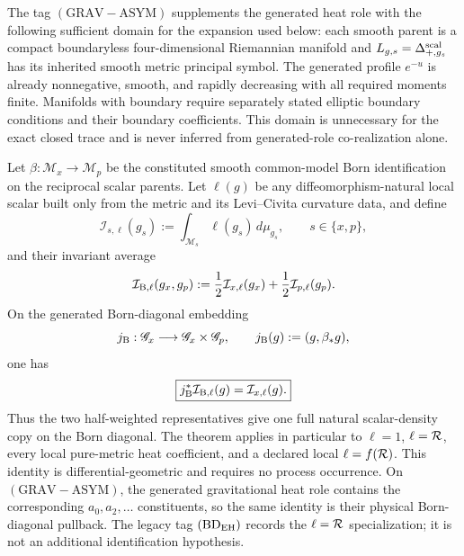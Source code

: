 \documentclass[12pt,a4paper]{article}
\begin{document}
\begin{definition}
\label{p3e:def:grav-smooth-expansion-domain}
The tag \((\mathrm{GRAV\!-\!ASYM})\) supplements the generated heat role with
the following sufficient domain for the expansion used below: each smooth
parent is a compact boundaryless four-dimensional Riemannian manifold and
\(L_{g,s}=\Delta_{+,g_s}^{\rm scal}\) has its inherited smooth metric
principal symbol.  The generated profile \(e^{-u}\) is already nonnegative,
smooth, and rapidly decreasing with all required moments finite.  Manifolds with
boundary require separately stated elliptic boundary conditions and their
boundary coefficients.  This domain is unnecessary for the exact closed
trace and is never inferred from generated-role co-realization alone.
\end{definition}

\begin{theorem}
\label{p3e:thm:born-orbit-eh-identification}
Let \(\beta:\mathcal M_x\to\mathcal M_p\) be the constituted smooth
common-model Born identification on the reciprocal scalar parents.  Let
\(\ell(g)\) be any diffeomorphism-natural local scalar built only from the
metric and its Levi--Civita curvature data, and define
\[
 \mathcal I_{s,\ell}(g_s):=\int_{\mathcal M_s}
 \ell(g_s)\,d\mu_{g_s},
 \qquad s\in\{x,p\},
\]
and their invariant average
\[
 \mathcal I_{{\rm B},\ell}(g_x,g_p)
 :=\frac12\mathcal I_{x,\ell}(g_x)
   +\frac12\mathcal I_{p,\ell}(g_p).
\]
On the generated Born-diagonal embedding
\[
 j_{\rm B}:\mathscr G_x\longrightarrow\mathscr G_x\times\mathscr G_p,
 \qquad
 j_{\rm B}(g):=(g,\beta_*g),
\]
one has
\[
\boxed{j_{\rm B}^*\mathcal I_{{\rm B},\ell}(g)
=\mathcal I_{x,\ell}(g).}
\]
Thus the two half-weighted representatives give one full natural scalar-density
copy on the Born diagonal.  The theorem applies in particular to
\(\ell=1\), \(\ell=\mathcal R\), every local pure-metric heat coefficient, and a
declared local \(\ell=f(\mathcal R)\).  This identity is differential-geometric and
requires no process occurrence.  On \((\mathrm{GRAV\!-\!ASYM})\), the
generated gravitational heat role contains the corresponding \(a_0,a_2,\ldots\)
constituents, so the same identity is their physical Born-diagonal pullback.
The legacy tag \((\mathrm{BD}_{\rm EH})\) records the
\(\ell=\mathcal R\) specialization; it is not an additional identification
hypothesis.
\end{theorem}
\end{document}
